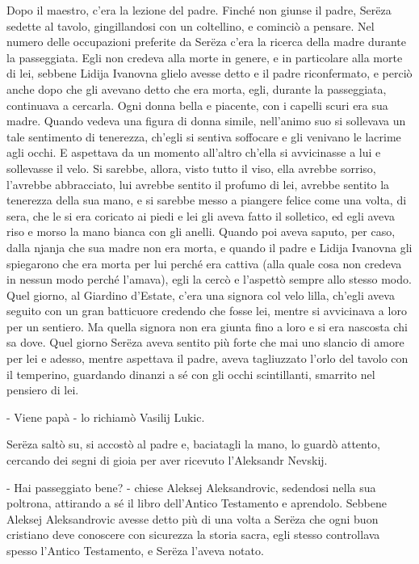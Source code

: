Dopo il maestro, c'era la lezione del padre. Finché non giunse il padre, Serëza sedette al tavolo, gingillandosi con un coltellino, e cominciò a pensare. Nel numero delle occupazioni preferite da Serëza c'era la ricerca della madre durante la passeggiata. Egli non credeva alla morte in genere, e in particolare alla morte di lei, sebbene Lidija Ivanovna glielo avesse detto e il padre riconfermato, e perciò anche dopo che gli avevano detto che era morta, egli, durante la passeggiata, continuava a cercarla. Ogni donna bella e piacente, con i capelli scuri era sua madre. Quando vedeva una figura di donna simile, nell'animo suo si sollevava un tale sentimento di tenerezza, ch'egli si sentiva soffocare e gli venivano le lacrime agli occhi. E aspettava da un momento all'altro ch'ella si avvicinasse a lui e sollevasse il velo. Si sarebbe, allora, visto tutto il viso, ella avrebbe sorriso, l'avrebbe abbracciato, lui avrebbe sentito il profumo di lei, avrebbe sentito la tenerezza della sua mano, e si sarebbe messo a piangere felice come una volta, di sera, che le si era coricato ai piedi e lei gli aveva fatto il solletico, ed egli aveva riso e morso la mano bianca con gli anelli. Quando poi aveva saputo, per caso, dalla njanja che sua madre non era morta, e quando il padre e Lidija Ivanovna gli spiegarono che era morta per lui perché era cattiva (alla quale cosa non credeva in nessun modo perché l'amava), egli la cercò e l'aspettò sempre allo stesso modo. Quel giorno, al Giardino d'Estate, c'era una signora col velo lilla, ch'egli aveva seguito con un gran batticuore credendo che fosse lei, mentre si avvicinava a loro per un sentiero. Ma quella signora non era giunta fino a loro e si era nascosta chi sa dove. Quel giorno Serëza aveva sentito più forte che mai uno slancio di amore per lei e adesso, mentre aspettava il padre, aveva tagliuzzato l'orlo del tavolo con il temperino, guardando dinanzi a sé con gli occhi scintillanti, smarrito nel pensiero di lei. 

- Viene papà - lo richiamò Vasilij Lukic. 

Serëza saltò su, si accostò al padre e, baciatagli la mano, lo guardò attento, cercando dei segni di gioia per aver ricevuto l'Aleksandr Nevskij. 

- Hai passeggiato bene? - chiese Aleksej Aleksandrovic, sedendosi nella sua poltrona, attirando a sé il libro dell'Antico Testamento e aprendolo. Sebbene Aleksej Aleksandrovic avesse detto più di una volta a Serëza che ogni buon cristiano deve conoscere con sicurezza la storia sacra, egli stesso controllava spesso l'Antico Testamento, e Serëza l'aveva notato. 

